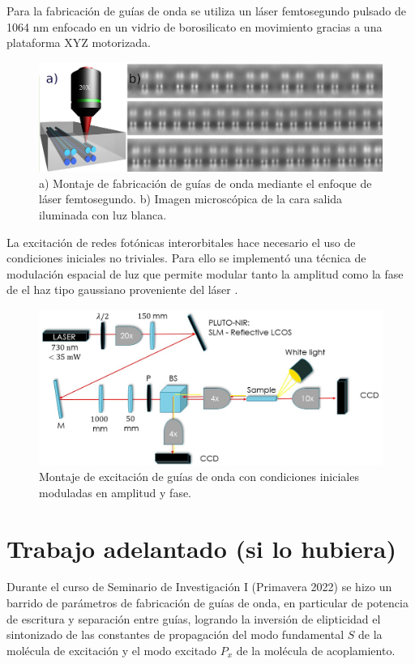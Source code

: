 \documentclass{article}
\begin{document}
Para la fabricación de guías de onda se utiliza un láser femtosegundo pulsado de 1064 nm enfocado en un vidrio de borosilicato en movimiento gracias a una plataforma XYZ motorizada.

\begin{figure}[H]
	\centering
	\includegraphics[width=0.9\linewidth]{./media/femtosetup.png}
	\caption{a) Montaje de fabricación de guías de onda mediante el enfoque de láser femtosegundo. b)      Imagen microscópica de la cara salida iluminada con luz blanca. \label{fig:SLM}}
\end{figure}


La excitación de redes fotónicas interorbitales hace necesario el uso de condiciones iniciales no triviales. Para ello se implementó una técnica de modulación espacial de luz que permite modular tanto la amplitud como la fase de el haz tipo gaussiano proveniente del láser \cite{slm}.

\begin{figure}[H]
	\centering
	\includegraphics[width=0.9\linewidth]{./media/SLMsetup.png}
	\caption{Montaje de excitación de guías de onda con condiciones iniciales moduladas en amplitud y fase.\label{fig:femtosetup}}
\end{figure}

\section{Trabajo adelantado (si lo hubiera)}

Durante el curso de Seminario de Investigación I (Primavera 2022) se hizo un barrido de parámetros de fabricación de guías de onda, en particular de potencia de escritura y separación entre guías, logrando la inversión de elipticidad el sintonizado de las constantes de propagación del modo fundamental $S$ de la molécula de excitación y el modo excitado $P_x$ de la molécula de acoplamiento.
\end{document}
